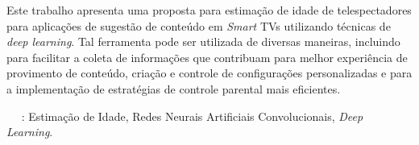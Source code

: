 

  Este trabalho apresenta uma proposta para estimação de idade de telespectadores para aplicações de sugestão de conteúdo em \emph{Smart} TVs utilizando técnicas de \emph{deep learning}. Tal ferramenta pode ser utilizada de diversas maneiras, incluindo para facilitar a coleta de informações que contribuam para melhor experiência de provimento de conteúdo, criação e controle de configurações personalizadas e para a implementação de estratégias de controle parental mais eficientes.


  \ \ \newline
  : Estimação de Idade, Redes Neurais Artificiais Convolucionais, \emph{Deep Learning}.
